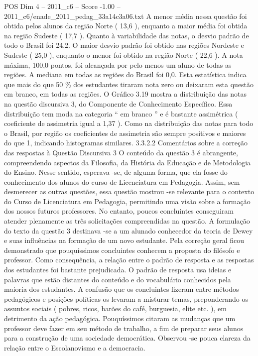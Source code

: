\begin{textsample}{POS Dim 4 – 2011\_c6 – Score -1.00 – 2011\_c6/enade\_2011\_pedag\_33a14c3a06.txt}
A menor média nessa questão foi obtida pelos alunos da região Norte ( 13,6 ), enquanto a maior média foi obtida na região Sudeste ( 17,7 ).
Quanto à variabilidade das notas, o desvio padrão de todo o Brasil foi 24,2.
O maior desvio padrão foi obtido nas regiões Nordeste e Sudeste ( 25,0 ), enquanto o menor foi obtido na região Norte ( 22,6 ).
A nota máxima, 100,0 pontos, foi alcançada por pelo menos um aluno de todas as regiões.
A mediana em todas as regiões do Brasil foi 0,0.
Esta estatística indica que mais do que 50 \% dos estudantes tiraram nota zero ou deixaram esta questão em branco, em todas as regiões.
O Gráfico 3.19 mostra a distribuição das notas na questão discursiva 3, do Componente de Conhecimento Específico.
Essa distribuição tem moda na categoria “ em branco ” e é bastante assimétrica ( coeficiente de assimetria igual a 1,37 ).
Como na distribuição das notas para todo o Brasil, por região os coeficientes de assimetria são sempre positivos e maiores do que 1, indicando histogramas similares. 3.3.2.2 Comentários sobre a correção das respostas à Questão Discursiva 3 O conteúdo da questão 3 é abrangente, compreendendo aspectos da Filosofia, da História da Educação e de Metodologia do Ensino.
Nesse sentido, esperava -se, de alguma forma, que ela fosse do conhecimento dos alunos do curso de Licenciatura em Pedagogia.
Assim, sem desmerecer as outras questões, essa questão mostrou -se relevante para o contexto do Curso de Licenciatura em Pedagogia, permitindo uma visão sobre a formação dos nossos futuros professores.
No entanto, poucos concluintes conseguiram atender plenamente as três solicitações compreendidas na questão.
A formulação do texto da questão 3 destinava -se a um alunado conhecedor da teoria de Dewey e suas influências na formação de um novo estudante.
Pela correção geral ficou demonstrado que pouquíssimos concluintes conhecem a proposta do filósofo e professor.
Como consequência, a relação entre o padrão de resposta e as respostas dos estudantes foi bastante prejudicada.
O padrão de resposta usa ideias e palavras que estão distantes do conteúdo e do vocabulário conhecidos pela maioria dos estudantes.
A confusão que os concluintes fizeram entre métodos pedagógicos e posições políticas os levaram a misturar temas, preponderando os assuntos sociais ( pobres, ricos, barões do café, burguesia, elite etc. ), em detrimento da ação pedagógica.
Pouquíssimos citaram as mudanças que um professor deve fazer em seu método de trabalho, a fim de preparar seus alunos para a construção de uma sociedade democrática.
Observou -se pouca clareza da relação entre o Escolanovismo e a democracia.

\end{textsample}
